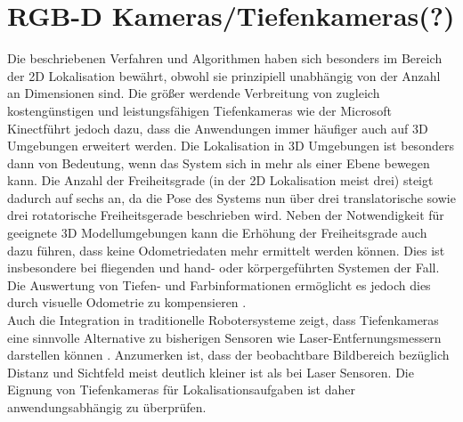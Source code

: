 \section{RGB-D Kameras/Tiefenkameras(?)}
Die beschriebenen Verfahren und Algorithmen haben sich besonders im Bereich der 2D Lokalisation bewährt, obwohl sie prinzipiell unabhängig von der Anzahl an Dimensionen sind. Die größer werdende Verbreitung von zugleich kostengünstigen und leistungsfähigen Tiefenkameras wie der Microsoft Kinect\red[Tm] führt jedoch dazu, dass die Anwendungen immer häufiger auch auf 3D Umgebungen erweitert werden. Die Lokalisation in 3D Umgebungen ist besonders dann von Bedeutung, wenn das System sich in mehr als einer Ebene bewegen kann. Die Anzahl der Freiheitsgrade (in der 2D Lokalisation meist drei) steigt dadurch auf sechs an, da die Pose des Systems nun über drei translatorische sowie drei rotatorische Freiheitsgerade beschrieben wird. Neben der Notwendigkeit für geeignete 3D Modellumgebungen kann die Erhöhung der Freiheitsgrade auch dazu führen, dass keine Odometriedaten mehr ermittelt werden können. Dies ist insbesondere bei fliegenden \cite{Huang2011} und hand- oder körpergeführten Systemen \cite{Fallon2012} der Fall. Die Auswertung von Tiefen- und Farbinformationen ermöglicht es jedoch dies durch visuelle Odometrie zu kompensieren \cite{Whelan2013robust}.\\
Auch die Integration in traditionelle Robotersysteme zeigt, dass Tiefenkameras eine sinnvolle Alternative zu bisherigen Sensoren wie Laser-Entfernungsmessern darstellen können \cite{Cunha2011} \cite{Eriksson2012}. Anzumerken ist, dass der beobachtbare Bildbereich bezüglich Distanz und Sichtfeld meist deutlich kleiner ist als bei Laser Sensoren. Die Eignung von Tiefenkameras für Lokalisationsaufgaben ist daher anwendungsabhängig zu überprüfen.\\

\\


